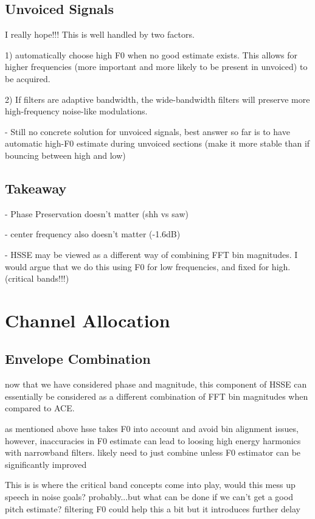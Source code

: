 \documentclass [11pt, proquest] {uwthesis}[2015/03/03]
\begin{document}
\subsection{Unvoiced Signals}

I really hope!!!  This is well handled by two factors.

1) automatically choose high F0 when no good estimate exists.  This allows for higher frequencies (more important and more likely to be present in unvoiced) to be acquired.

2) If filters are adaptive bandwidth, the wide-bandwidth filters will preserve more high-frequency noise-like modulations.


 - Still no concrete solution for unvoiced signals, best answer so far is to have automatic high-F0 estimate during unvoiced sections (make it more stable than if bouncing between high and low)

\subsection{Takeaway}

 - Phase Preservation doesn't matter (shh vs saw)
 
 - center frequency also doesn't matter (-1.6dB)
 
 - HSSE may be viewed as a different way of combining FFT bin magnitudes.  I would argue that we do this using F0 for low frequencies, and fixed for high.  (critical bands!!!)

\section{Channel Allocation}

\subsection{Envelope Combination}

now that we have considered phase and magnitude, this component of HSSE can essentially be considered as a different combination of FFT bin magnitudes when compared to ACE.

as mentioned above hsse takes F0 into account and avoid bin alignment issues, however, inaccuracies in F0 estimate can lead to loosing high energy harmonics with narrowband filters.  likely need to just combine unless F0 estimator can be significantly improved

This is is where the critical band concepts come into play, would this mess up speech in noise goals? probably...but what can be done if we can't get a good pitch estimate?  filtering F0 could help this a bit but it introduces further delay
\end{document}
